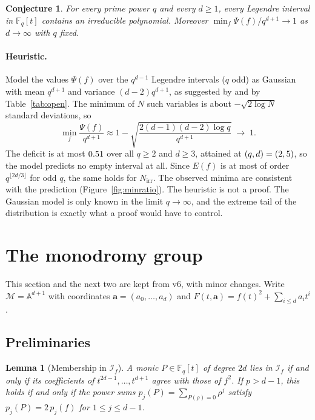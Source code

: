 \documentclass[11pt,a4paper]{article}
\newtheorem{lemma}[theorem]{Lemma}
\newtheorem{conjecture}[theorem]{Conjecture}
\theoremstyle{definition}
\theoremstyle{remark}
\newcommand{\Fq}{\mathbb{F}_q}
\newcommand{\A}{\mathbb{A}}
\newcommand{\Nirr}{N_{\mathrm{irr}}}
\newcommand{\cI}{\mathcal{I}}
\newcommand{\cM}{\mathcal{M}}
\newcommand{\ba}{\mathbf{a}}
\begin{document}
\begin{conjecture}\label{conj:main}
For every prime power $q$ and every $d\ge1$, every Legendre interval in $\Fq[t]$ contains an
irreducible polynomial. Moreover $\min_f\Psi(f)/q^{d+1}\to1$ as $d\to\infty$ with $q$ fixed.
\end{conjecture}

\paragraph{Heuristic.}
Model the values $\Psi(f)$ over the $q^{d-1}$ Legendre intervals ($q$ odd) as Gaussian with mean
$q^{d+1}$ and variance $(d-2)q^{d+1}$, as suggested by \cite{KR2014} and by Table~\ref{tab:open}.
The minimum of $N$ such variables is about $-\sqrt{2\log N}$ standard deviations, so
\[
 \min_f\frac{\Psi(f)}{q^{d+1}}\approx1-\sqrt{\frac{2(d-1)(d-2)\log q}{q^{d+1}}}\;\longrightarrow\;1 .
\]
The deficit is at most $0.51$ over all $q\ge2$ and $d\ge3$, attained at $(q,d)=(2,5)$,
so the model predicts no empty interval at all. Since $E(f)$ is at most of order $q^{\lfloor2d/3\rfloor}$ for odd $q$, the same
holds for $\Nirr$. The observed minima are consistent with the prediction (Figure~\ref{fig:minratio}).
The heuristic is not a proof. The Gaussian model is only known in the limit $q\to\infty$, and the
extreme tail of the distribution is exactly what a proof would have to control.

\section{The monodromy group}\label{sec:monodromy}

This section and the next two are kept from v6, with minor changes. Write
$\cM=\A^{d+1}$ with coordinates $\ba=(a_0,\dots,a_d)$ and $F(t,\ba)=f(t)^2+\sum_{i\le d}a_it^i$.

\subsection{Preliminaries}

\begin{lemma}[Membership in $\cI_f$]\label{lem:membership}
A monic $P\in\Fq[t]$ of degree $2d$ lies in $\cI_f$ if and only if its
coefficients of $t^{2d-1},\dots,t^{d+1}$ agree with those of $f^2$.
If $p>d-1$, this holds if and only if the power sums
$p_j(P)=\sum_{P(\rho)=0}\rho^j$ satisfy $p_j(P)=2\,p_j(f)$ for $1\le j\le d-1$.
\end{lemma}
\end{document}

